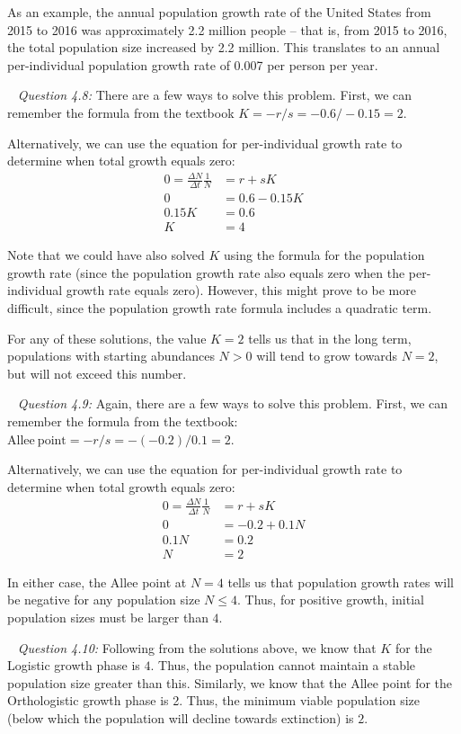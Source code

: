 \documentclass[12pt]{article}
\begin{document}
As an example, the annual population growth rate of the United States from 2015 to 2016 was approximately 2.2 million people -- that is, from 2015 to 2016, the total population size increased by 2.2 million. This translates to an annual per-individual population growth rate of 0.007 per person per year.

~\newline
\textit{Question 4.8:}
\newline
There are a few ways to solve this problem. First, we can remember the formula from the textbook $K = -r/s = -0.6/-0.15 = 2$.

Alternatively, we can use the equation for per-individual growth rate to determine when total growth equals zero:
\begin{align*}
0 = \frac{\Delta N}{\Delta t}\frac{1}{N} &= r + s K\\
0 &= 0.6 - 0.15 K \\
0.15 K &= 0.6 \\
K &= 4
\end{align*}

Note that we could have also solved $K$ using the formula for the population growth rate (since the population growth rate also equals zero when the per-individual growth rate equals zero). However, this might prove to be more difficult, since the population growth rate formula includes a quadratic term.

For any of these solutions, the value $K = 2$ tells us that in the long term, populations with starting abundances $N>0$ will tend to grow towards $N=2$, but will not exceed this number.

~\newline
\textit{Question 4.9:}
\newline
Again, there are a few ways to solve this problem. First, we can remember the formula from the textbook: $\mathrm{Allee~point} = -r/s = -(-0.2)/0.1 = 2$.

Alternatively, we can use the equation for per-individual growth rate to determine when total growth equals zero:
\begin{align*}
0 = \frac{\Delta N}{\Delta t}\frac{1}{N} &= r + s K\\
0 &= -0.2 + 0.1 N \\
0.1 N &= 0.2 \\
N &= 2
\end{align*}

In either case, the Allee point at $N = 4$ tells us that population growth rates will be negative for any population size $N\leq4$. Thus, for positive growth, initial population sizes must be larger than $4$.

~\newline
\textit{Question 4.10:}
\newline
Following from the solutions above, we know that $K$ for the Logistic growth phase is $4$. Thus, the population cannot maintain a stable population size greater than this. Similarly, we know that the Allee point for the Orthologistic growth phase is 2. Thus, the minimum viable population size (below which the population will decline towards extinction) is $2$.
\end{document}
